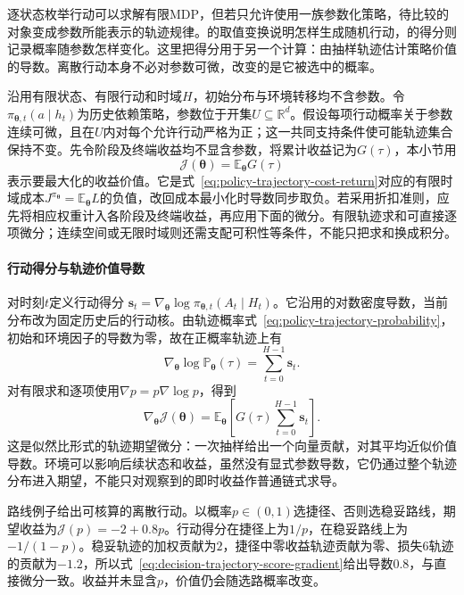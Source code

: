 逐状态枚举行动可以求解有限MDP，但若只允许使用一族参数化策略，待比较的对象变成参数所能表示的轨迹规律。的取值变换说明怎样生成随机行动，的得分则记录概率随参数怎样变化。这里把得分用于另一个计算：由抽样轨迹估计策略价值的导数。离散行动本身不必对参数可微，改变的是它被选中的概率。

沿用有限状态、有限行动和时域\(H\)，初始分布与环境转移均不含参数。令\(\pi_{\bm\theta,t}(a\mid h_t)\)为历史依赖策略，参数位于开集\(U\subseteq\mathbb R^d\)。假设每项行动概率关于参数连续可微，且在\(U\)内对每个允许行动严格为正；这一共同支持条件使可能轨迹集合保持不变。先令阶段及终端收益均不显含参数，将累计收益记为\(G(\tau)\)，本小节用
\[
 \mathcal J(\bm\theta)=\mathbb E_{\bm\theta}G(\tau)
\]
表示要最大化的收益价值。它是式~\eqref{eq:policy-trajectory-cost-return}对应的有限时域成本\(J^{\pi_{\bm\theta}}=\mathbb E_{\bm\theta}L\)的负值，改回成本最小化时导数同步取负。若采用折扣准则，应先将相应权重计入各阶段及终端收益，再应用下面的微分。有限轨迹求和可直接逐项微分；连续空间或无限时域则还需支配可积性等条件，不能只把求和换成积分。

\paragraph{行动得分与轨迹价值导数}
对时刻\(t\)定义行动得分
\(\bm s_t=\nabla_{\bm\theta}\log\pi_{\bm\theta,t}(A_t\mid H_t)\)。它沿用的对数密度导数，当前分布改为固定历史后的行动核。由轨迹概率式~\eqref{eq:policy-trajectory-probability}，初始和环境因子的导数为零，故在正概率轨迹上有
\[
 \nabla_{\bm\theta}\log\mathbb P_{\bm\theta}(\tau)
 =\sum_{t=0}^{H-1}\bm s_t.
\]
对有限求和逐项使用\(\nabla p=p\nabla\log p\)，得到
\begin{equation}
 \nabla_{\bm\theta}\mathcal J(\bm\theta)
 =\mathbb E_{\bm\theta}
 \left[G(\tau)\sum_{t=0}^{H-1}\bm s_t\right].
 \label{eq:decision-trajectory-score-gradient}
\end{equation}
这是似然比形式的轨迹期望微分：一次抽样给出一个向量贡献，对其平均近似价值导数。环境可以影响后续状态和收益，虽然没有显式参数导数，它仍通过整个轨迹分布进入期望，不能只对观察到的即时收益作普通链式求导。

路线例子给出可核算的离散行动。以概率\(p\in(0,1)\)选捷径、否则选稳妥路线，期望收益为\(\mathcal J(p)=-2+0.8p\)。行动得分在捷径上为\(1/p\)，在稳妥路线上为\(-1/(1-p)\)。稳妥轨迹的加权贡献为\(2\)，捷径中零收益轨迹贡献为零、损失\(6\)轨迹的贡献为\(-1.2\)，所以式~\eqref{eq:decision-trajectory-score-gradient}给出导数\(0.8\)，与直接微分一致。收益并未显含\(p\)，价值仍会随选路概率改变。

